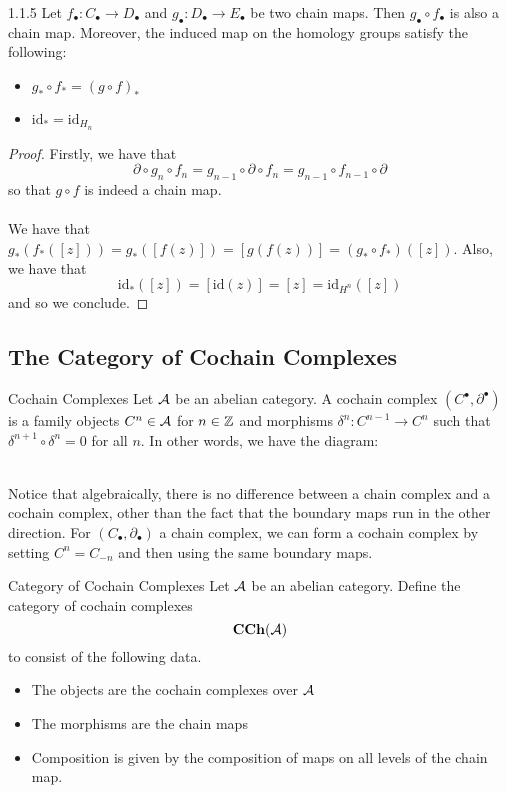 \documentclass[a4paper]{article}
\begin{document}
\begin{prp}{}{1.1.5} Let $f_\bullet:C_\bullet\to D_\bullet$ and $g_\bullet:D_\bullet\to E_\bullet$ be two chain maps. Then $g_\bullet\circ f_\bullet$ is also a chain map. Moreover, the induced map on the homology groups satisfy the following: 
\begin{itemize}
\item $g_\ast\circ f_\ast=(g\circ f)_\ast$
\item $\text{id}_\ast=\text{id}_{H_n}$
\end{itemize} \tcbline
\begin{proof}
Firstly, we have that $$\partial\circ g_n\circ f_n=g_{n-1}\circ\partial\circ f_n=g_{n-1}\circ f_{n-1}\circ\partial$$ so that $g\circ f$ is indeed a chain map. \\~\\

We have that $g_\ast(f_\ast([z]))=g_\ast([f(z)])=[g(f(z))]=(g_\ast\circ f_\ast)([z])$. Also, we have that $$\text{id}_\ast([z])=[\text{id}(z)]=[z]=\text{id}_{H^n}([z])$$ and so we conclude. 
\end{proof}
\end{prp}

\subsection{The Category of Cochain Complexes}
\begin{defn}{Cochain Complexes}{} Let $\mathcal{A}$ be an abelian category. A cochain complex $(C^\bullet,\partial^\bullet)$ is a family objects $C^n\in\mathcal{A}$ for $n\in\mathbb{Z}$ and morphisms $\delta^n:C^{n-1}\to C^n$ such that $\delta^{n+1}\circ\delta^n=0$ for all $n$. In other words, we have the diagram: \\~\\
\end{defn}

Notice that algebraically, there is no difference between a chain complex and a cochain complex, other than the fact that the boundary maps run in the other direction. For $(C_\bullet,\partial_\bullet)$ a chain complex, we can form a cochain complex by setting $C^n=C_{-n}$ and then using the same boundary maps. 

\begin{defn}{Category of Cochain Complexes}{} Let $\mathcal{A}$ be an abelian category. Define the category of cochain complexes $$\bold{CCh}(\mathcal{A})$$ to consist of the following data. 
\begin{itemize}
\item The objects are the cochain complexes over $\mathcal{A}$
\item The morphisms are the chain maps
\item Composition is given by the composition of maps on all levels of the chain map. 
\end{itemize}
\end{defn}
\end{document}
